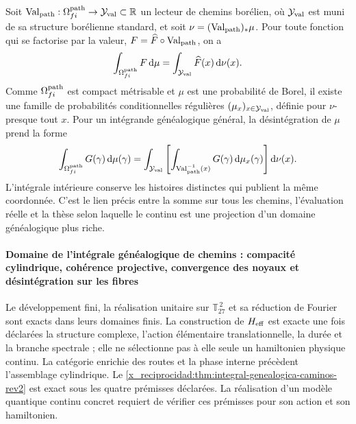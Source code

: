 Soit
\(\operatorname{Val}_{\rm path}:\Omega^{\rm path}_{fi}\to\mathcal Y_{\rm val}\subset\mathbb R\)
un lecteur de chemins borélien, où \(\mathcal Y_{\rm val}\) est muni de sa structure
borélienne standard, et soit
\(\nu=(\operatorname{Val}_{\rm path})_*\mu\). Pour toute fonction qui
se factorise par la valeur, \(F=\widehat F\circ\operatorname{Val}_{\rm path}\),
on a
\[
 \int_{\Omega^{\rm path}_{fi}}F\,\mathrm d\mu
 =\int_{\mathcal Y_{\rm val}}\widehat F(x)\,\mathrm d\nu(x).
\]
Comme \(\Omega^{\rm path}_{fi}\) est compact métrisable et \(\mu\) est une
probabilité de Borel, il existe une famille de probabilités conditionnelles
régulières \((\mu_x)_{x\in\mathcal Y_{\rm val}}\), définie pour \(\nu\)-presque tout \(x\). Pour
un intégrande généalogique général, la désintégration de \(\mu\) prend la forme
\begin{equation}
 \int_{\Omega^{\rm path}_{fi}}G(\gamma)\,\mathrm d\mu(\gamma)
 =\int_{\mathcal Y_{\rm val}}\left[
   \int_{\operatorname{Val}_{\rm path}^{-1}(x)}
   G(\gamma)\,\mathrm d\mu_x(\gamma)
  \right]\mathrm d\nu(x).
 \label{x_reciprocidad:eq:desintegracion-genealogica-caminos-rev2}
\end{equation}
L’intégrale intérieure conserve les histoires distinctes qui publient la même coordonnée. C’est le lien précis entre la somme sur tous les chemins, l’évaluation réelle et la thèse selon laquelle le continu est une projection d’un domaine généalogique plus riche.

\paragraph{Domaine de l’intégrale généalogique de chemins : compacité cylindrique, cohérence projective, convergence des noyaux et désintégration sur les fibres}
Le développement fini, la réalisation unitaire sur
\(\mathbb T_{27}^{\,2}\) et sa réduction de Fourier sont exacts dans leurs domaines
finis. La construction de \(H_{\rm eff}\) est
exacte une fois déclarées la structure complexe, l’action élémentaire
translationnelle, la durée et la branche spectrale ; elle ne sélectionne pas à elle seule un
hamiltonien physique continu. La catégorie enrichie des routes et la phase
interne précèdent l’assemblage cylindrique. Le
\cref{x_reciprocidad:thm:integral-genealogica-caminos-rev2} est exact sous les quatre
prémisses déclarées. La réalisation d’un modèle quantique continu concret
requiert de vérifier ces prémisses pour son action et son hamiltonien.
